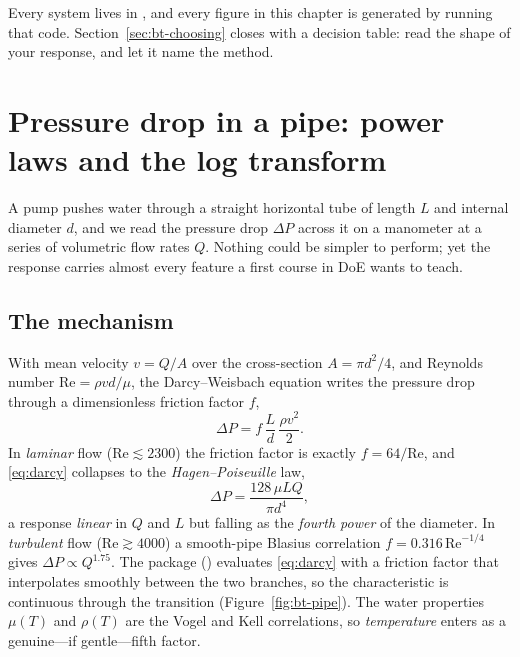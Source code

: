 Every system lives in , and every figure in
this chapter is generated by running that code. Section~\ref{sec:bt-choosing}
closes with a decision table: read the shape of your response, and let it name
the method.

\section{Pressure drop in a pipe: power laws and the log transform}
\label{sec:bt-pipe}

A pump pushes water through a straight horizontal tube of length $L$ and internal
diameter $d$, and we read the pressure drop $\Delta P$ across it on a manometer at
a series of volumetric flow rates $Q$. Nothing could be simpler to perform; yet
the response carries almost every feature a first course in DoE wants to teach.

\subsection{The mechanism}

With mean velocity $v = Q/A$ over the cross-section $A = \pi d^2/4$, and Reynolds
number $\mathrm{Re} = \rho v d/\mu$, the Darcy--Weisbach equation writes the
pressure drop through a dimensionless friction factor $f$,
%
\begin{equation}
\Delta P = f\,\frac{L}{d}\,\frac{\rho v^2}{2}.
\label{eq:darcy}
\end{equation}
%
In \emph{laminar} flow ($\mathrm{Re}\lesssim 2300$) the friction factor is
exactly $f = 64/\mathrm{Re}$, and \eqref{eq:darcy} collapses to the
\emph{Hagen--Poiseuille} law,
%
\begin{equation}
\Delta P = \frac{128\,\mu L Q}{\pi d^4},
\label{eq:hagen}
\end{equation}
%
a response \emph{linear} in $Q$ and $L$ but falling as the \emph{fourth power} of
the diameter. In \emph{turbulent} flow ($\mathrm{Re}\gtrsim 4000$) a smooth-pipe
Blasius correlation $f = 0.316\,\mathrm{Re}^{-1/4}$ gives $\Delta P \propto
Q^{1.75}$. The package () evaluates \eqref{eq:darcy} with a
friction factor that interpolates smoothly between the two branches, so the
characteristic is continuous through the transition (Figure~\ref{fig:bt-pipe}).
The water properties $\mu(T)$ and $\rho(T)$ are the Vogel and Kell correlations,
so \emph{temperature} enters as a genuine---if gentle---fifth factor.

